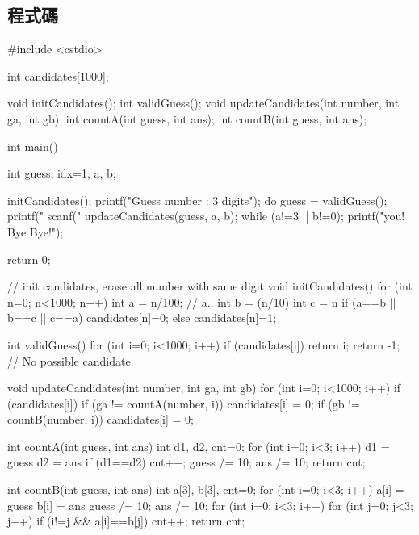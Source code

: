 \documentclass[12pt,a4paper]{article}
\begin{document}
\subsection{程式碼}
\begin{cppcode}
	#include <cstdio>
	
	int candidates[1000];
	
	void initCandidates();
	int  validGuess();
	void updateCandidates(int number, int ga, int gb);
	int  countA(int guess, int ans);
	int  countB(int guess, int ans);
	
	int main()
	{
		int guess, idx=1, a, b;
		
		initCandidates();
		printf("Guess number : 3 digits\n\n");
		do {
			guess = validGuess();
			printf("%
			scanf("%
			updateCandidates(guess, a, b);
		} while (a!=3 || b!=0);
		printf("\nThank you! Bye Bye!\n");
		
		return 0;
	}
	
	// init candidates, erase all number with same digit
	void initCandidates()
	{
		for (int n=0; n<1000; n++) {
			int a = n/100;       // a..
			int b = (n/10) %
			int c = n %
			if (a==b || b==c || c==a) candidates[n]=0;
			else candidates[n]=1;
		}
	}
	
	int validGuess()
	{
		for (int i=0; i<1000; i++) {
			if (candidates[i]) return i;
		}
		return -1; // No possible candidate
	}
	
	void updateCandidates(int number, int ga, int gb)
	{
		for (int i=0; i<1000; i++) {
			if (candidates[i]) {
				if (ga != countA(number, i)) candidates[i] = 0;
				if (gb != countB(number, i)) candidates[i] = 0;
			}
		}
	}
	
	int countA(int guess, int ans)
	{
		int d1, d2, cnt=0;
		for (int i=0; i<3; i++) {
			d1 = guess %
			d2 = ans %
			if (d1==d2) cnt++;
			guess /= 10;
			ans /= 10;
		}
		return cnt;
	}
	
	int countB(int guess, int ans)
	{
		int a[3], b[3], cnt=0;
		for (int i=0; i<3; i++) {
			a[i] = guess %
			b[i] = ans %
			guess /= 10;
			ans /= 10;
		}
		for (int i=0; i<3; i++) {
			for (int j=0; j<3; j++) {
				if (i!=j && a[i]==b[j]) cnt++;
			}
		}
		return cnt;
	}
	
\end{cppcode}
\end{document}
